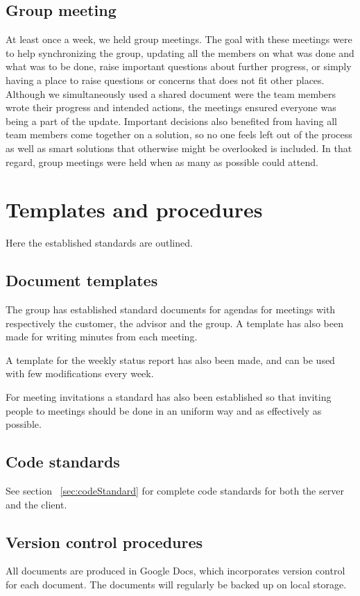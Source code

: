\documentclass[11pt]{book}
\begin{document}
\subsection{Group meeting}
At least once a week, we held group meetings. The goal with these meetings were to help synchronizing the group, updating all the members on what was done and what was to be done, raise important questions about further progress, or simply having a place to raise questions or concerns that does not fit other places. Although we simultaneously used a shared document were the team members wrote their progress and intended actions, the meetings ensured everyone was being a part of the update. Important decisions also benefited from having all team members come together on a solution, so no one feels left out of the process as well as smart solutions that otherwise might be overlooked is included.  In that regard, group meetings were held when as many as possible could attend.

\section{Templates and procedures}
Here the established standards are outlined.

\subsection{Document templates}
The group has established standard documents for agendas for meetings with respectively the customer, the advisor and the group. A template has also been made for writing minutes from each meeting.

A template for the weekly status report has also been made, and can be used with few modifications every week.

For meeting invitations a standard has also been established so that inviting people to meetings should be done in an uniform way and as effectively as possible.

\subsection{Code standards}
See section ~\ref{sec:codeStandard} for complete code standards for both the server and the client.

\subsection{Version control procedures}
All documents are produced in Google Docs, which incorporates version control for each document. The documents will regularly be backed up on local storage.
\end{document}

